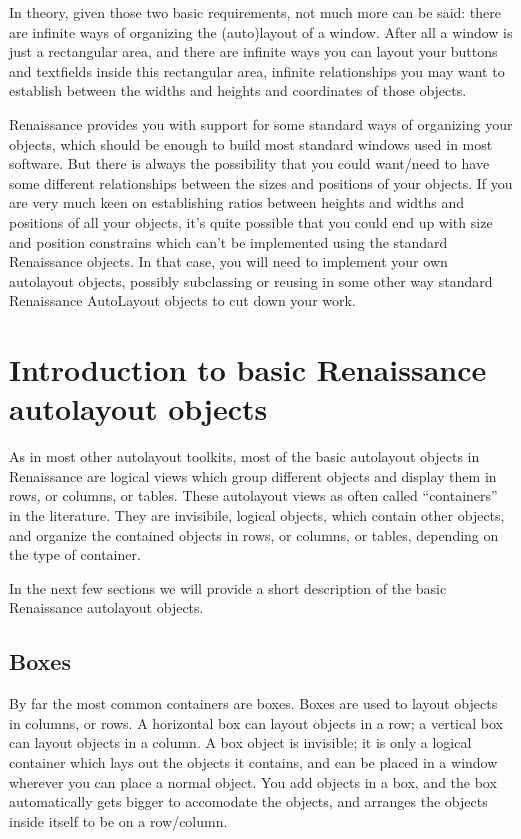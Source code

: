 In theory, given those two basic requirements, not much more can be
said: there are infinite ways of organizing the (auto)layout of a
window.  After all a window is just a rectangular area, and there are
infinite ways you can layout your buttons and textfields inside this
rectangular area, infinite relationships you may want to establish
between the widths and heights and coordinates of those objects.

Renaissance provides you with support for some standard ways of organizing
your objects, which should be enough to build most standard windows
used in most software.  But there is always the possibility that you
could want/need to have some different relationships between the sizes
and positions of your objects.  If you are very much keen on
establishing ratios between heights and widths and positions of all
your objects, it's quite possible that you could end up with size and
position constrains which can't be implemented using the standard
Renaissance objects.  In that case, you will need to implement your own
autolayout objects, possibly subclassing or reusing in some other way
standard Renaissance AutoLayout objects to cut down your work.

\section{Introduction to basic Renaissance autolayout objects}
As in most other autolayout toolkits, most of the basic autolayout
objects in Renaissance are logical views which group different objects and
display them in rows, or columns, or tables.  These autolayout views
as often called ``containers'' in the literature.  They are
invisibile, logical objects, which contain other objects, and organize
the contained objects in rows, or columns, or tables, depending on the
type of container.

In the next few sections we will provide a short description of the
basic Renaissance autolayout objects.

\subsection{Boxes}
By far the most common containers are boxes.  Boxes are used to layout
objects in columns, or rows.  A horizontal box can layout objects in a
row; a vertical box can layout objects in a column.  A box object is
invisible; it is only a logical container which lays out the objects
it contains, and can be placed in a window wherever you can place a
normal object.  You add objects in a box, and the box automatically
gets bigger to accomodate the objects, and arranges the objects inside
itself to be on a row/column.

